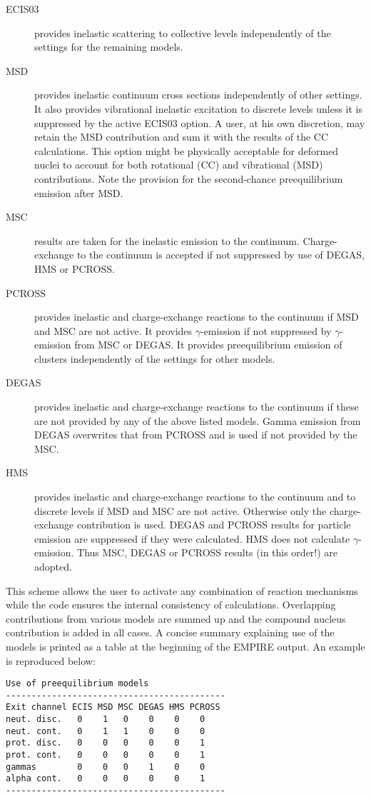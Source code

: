 \begin{description}
\item[ECIS03] provides inelastic scattering to collective levels
independently of the settings for the remaining models.

\item[MSD] provides inelastic continuum cross sections
independently of other settings. It
also provides vibrational inelastic excitation to discrete levels unless it is
suppressed by the active ECIS03 option. A user, at his own discretion, may
retain the MSD contribution and sum it with the results of the CC
calculations. This option might be physically acceptable for deformed nuclei
to account for both rotational (CC) and vibrational (MSD) contributions.
Note the provision for the second-chance preequilibrium emission after MSD.

\item[MSC] results are taken for the inelastic emission to the continuum.
Charge-exchange to the continuum is accepted if not suppressed by use of
DEGAS, HMS or PCROSS.

\item[PCROSS] provides inelastic and charge-exchange reactions
to the continuum if MSD
and MSC are not active. It provides $\gamma$-emission if not suppressed by $%
\gamma$-emission from MSC or DEGAS. It provides preequilibrium emission of
clusters independently of the settings for other models.

\item[DEGAS] provides inelastic and charge-exchange reactions
to the continuum if
these are not provided by any of the above listed models. Gamma emission
from DEGAS overwrites that from PCROSS and is used if not provided by the
MSC.

\item[HMS] provides inelastic and charge-exchange reactions
to the continuum and to
discrete levels if MSD and MSC are not active. Otherwise only the
charge-exchange contribution is used. DEGAS and PCROSS results
for particle emission are suppressed if they were calculated.
HMS does not calculate $\gamma$-emission.
Thus MSC, DEGAS or PCROSS results (in this order!) are adopted.
\end{description}

This scheme allows the user to activate any combination of reaction mechanisms
while the code ensures the internal consistency of calculations. Overlapping
contributions from various models are summed up and the compound nucleus
contribution is added in all cases. A concise summary explaining use of the
models is printed as a table at the beginning of the EMPIRE output. An
example is reproduced below:
\begin{verbatim}
Use of preequilibrium models
-------------------------------------------
Exit channel ECIS MSD MSC DEGAS HMS PCROSS
neut. disc.   0    1   0    0    0    0
neut. cont.   0    1   1    0    0    0
prot. disc.   0    0   0    0    0    1
prot. cont.   0    0   0    0    0    1
gammas        0    0   0    1    0    0
alpha cont.   0    0   0    0    0    1
-------------------------------------------
\end{verbatim}

